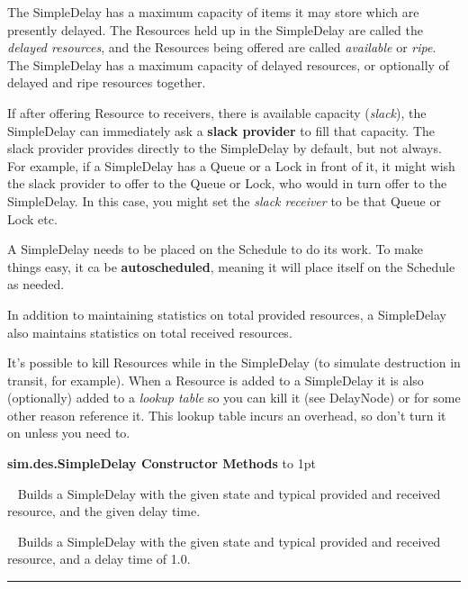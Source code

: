 \documentclass[twoside,10pt]{article}
\newcommand\class[1]{\index{Classes!{#1}}\textsf{#1}}
\newcommand*{\xfill}[1][0pt]{%
	\cleaders
		\hbox to 1pt{\hss
			\raisebox{#1}{\rule{1.2pt}{0.4pt}}%
			\hss}\hfill}
\newenvironment{methods}[1]{
\vspace{1.0em}\noindent\textsf{\textbf{#1 Methods}}\quad \xfill[0.5ex]
\vspace{-0.25em}
\begin{description}
\small}
{\end{description}\hrule\vspace{1.5em}}
\newcommand{\mthd}[1]{\item[{\sf #1}]~\newline}
\begin{document}
The SimpleDelay has a maximum capacity of items it may store which are presently delayed.  The Resources held up in the SimpleDelay are called the {\it delayed resources}, and the Resources being offered are called {\it available} or {\it ripe}.  The SimpleDelay has a maximum capacity of delayed resources, or optionally of delayed and ripe resources together.

If after offering Resource to receivers, there is available capacity ({\it slack}), the SimpleDelay can immediately ask a {\bf slack provider} to fill that capacity.  The slack provider provides directly to the SimpleDelay by default, but not always.  For example, if a SimpleDelay has a Queue or a Lock in front of it, it might wish the slack provider to offer to the Queue or Lock, who would in turn offer to the SimpleDelay.  In this case, you might set the {\it slack receiver} to be that Queue or Lock etc.

A SimpleDelay needs to be placed on the Schedule to do its work.  To make things easy, it ca be {\bf autoscheduled}, meaning it will place itself on the Schedule as needed.

In addition to maintaining statistics on total provided resources, a SimpleDelay also maintains statistics on total received resources.

It's possible to kill Resources while in the SimpleDelay (to simulate destruction in transit, for example).  When a Resource is added to a SimpleDelay it is also (optionally) added to a {\it lookup table} so you can kill it (see DelayNode) or for some other reason reference it.  This lookup table incurs an overhead, so don't turn it on unless you need to.

\begin{methods}{\class{sim.des.SimpleDelay} Constructor}
\mthd{public SimpleDelay(SimState state, double delayTime, Resource typical)}
Builds a SimpleDelay with the given state and typical provided and received resource, and the given delay time.
\mthd{public SimpleDelay(SimState state, Resource typical)}
Builds a SimpleDelay with the given state and typical provided and received resource, and a delay time of 1.0.
\end{methods}
\end{document}
